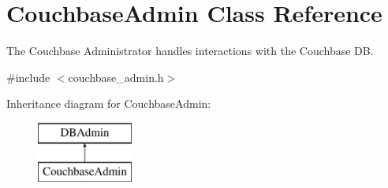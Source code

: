 \hypertarget{classCouchbaseAdmin}{\section{Couchbase\-Admin Class Reference}
\label{classCouchbaseAdmin}
}


The Couchbase Administrator handles interactions with the Couchbase D\-B.  




{\ttfamily \#include $<$couchbase\-\_\-admin.\-h$>$}

Inheritance diagram for Couchbase\-Admin\-:\begin{figure}[H]
\begin{center}
\leavevmode
\includegraphics[height=2.000000cm]{classCouchbaseAdmin}
\end{center}
\end{figure}

